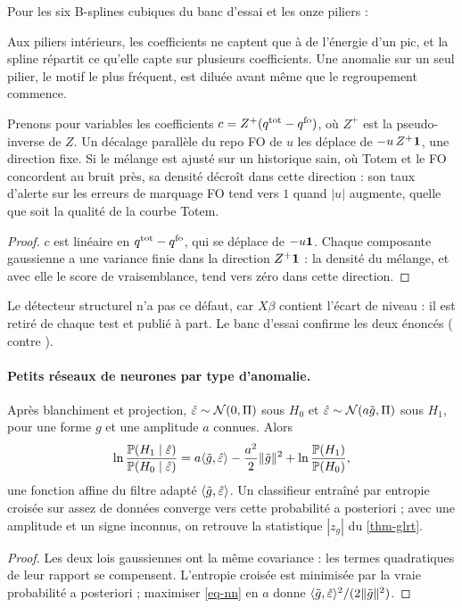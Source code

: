 Pour les six B-splines cubiques du banc d'essai et les onze piliers :
\begin{center}\end{center}
Aux piliers intérieurs, les coefficients ne captent que \vLevMin{} à \vLevMax{} de l'énergie d'un pic, et la spline
répartit ce qu'elle capte sur plusieurs coefficients. Une anomalie sur un seul pilier, le motif le plus fréquent, est
diluée avant même que le regroupement commence.

\begin{proposition}\label{prop-gmm-fo}
Prenons pour variables les coefficients $c=Z^+(q^{\mathrm{tot}}-q^{\mathrm{fo}})$, où $Z^+$ est la pseudo-inverse de $Z$. Un
décalage parallèle du repo FO de $u$ les déplace de $-u\,Z^+\mathbf{1}$, une direction fixe. Si le mélange est ajusté sur un
historique sain, où Totem et le FO concordent au bruit près, sa densité décroît dans cette direction : son taux
d'alerte sur les erreurs de marquage FO tend vers $1$ quand $|u|$ augmente, quelle que soit la qualité de la courbe
Totem.
\end{proposition}
\begin{proof}
$c$ est linéaire en $q^{\mathrm{tot}}-q^{\mathrm{fo}}$, qui se déplace de $-u\mathbf{1}$. Chaque composante gaussienne a une variance
finie dans la direction $Z^+\mathbf{1}$ : la densité du mélange, et avec elle le score de vraisemblance, tend vers zéro dans
cette direction.
\end{proof}
Le détecteur structurel n'a pas ce défaut, car $X\beta$ contient l'écart de niveau : il est retiré de chaque test et
publié à part. Le banc d'essai confirme les deux énoncés (\vFoGmmDiff{} contre \vFoStruct).

\paragraph{Petits réseaux de neurones par type d'anomalie.}
\begin{proposition}\label{prop-nn}
Après blanchiment et projection, $\hat\varepsilon\sim\mathcal{N}(0, \Pi)$ sous $H_0$ et $\hat\varepsilon\sim\mathcal{N}(a\tilde g, \Pi)$ sous $H_1$, pour une forme $g$ et
une amplitude $a$ connues. Alors
\begin{equation}\label{eq-nn}
\ln\frac{\mathbb P(H_1\mid\hat\varepsilon)}{\mathbb P(H_0\mid\hat\varepsilon)}=a\langle \tilde g, \hat\varepsilon\rangle-\frac{a^2}{2}\lVert \tilde g\rVert^2
+\ln\frac{\mathbb P(H_1)}{\mathbb P(H_0)},
\end{equation}
une fonction affine du filtre adapté $\langle \tilde g, \hat\varepsilon\rangle$. Un classifieur entraîné par entropie croisée sur assez de
données converge vers cette probabilité a posteriori ; avec une amplitude et un signe inconnus, on retrouve la
statistique $|z_g|$ du \cref{thm-glrt}.
\end{proposition}
\begin{proof}
Les deux lois gaussiennes ont la même covariance : les termes quadratiques de leur rapport se compensent. L'entropie
croisée est minimisée par la vraie probabilité a posteriori ; maximiser \eqref{eq-nn} en $a$ donne
$\langle \tilde g, \hat\varepsilon\rangle^2/(2\lVert \tilde g\rVert^2)$.
\end{proof}

